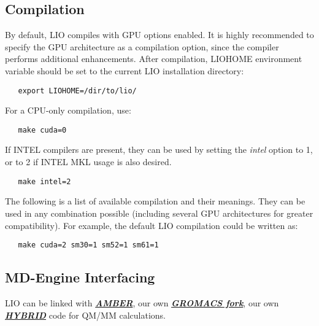 \subsection{Compilation}

By default, LIO compiles with GPU options enabled. It is highly
recommended to specify the GPU architecture as a compilation
option, since the compiler performs additional enhancements.
After compilation, LIOHOME environment variable should be set
to the current LIO installation directory:

\begin{lstlisting}
   export LIOHOME=/dir/to/lio/
\end{lstlisting}

For a CPU-only compilation, use:

\begin{lstlisting}
   make cuda=0
\end{lstlisting}

If INTEL compilers are present, they can be used by setting
the \textit{intel} option to 1, or to 2 if INTEL MKL usage is
also desired. 

\begin{lstlisting}
   make intel=2
\end{lstlisting}

The following is a list of available compilation and their meanings.
They can be used in any combination possible (including several GPU
architectures for greater compatibility). For example, the default
LIO compilation could be written as:

\begin{lstlisting}
   make cuda=2 sm30=1 sm52=1 sm61=1
\end{lstlisting}



\subsection{MD-Engine Interfacing}
LIO can be linked with  \textbf{\textit{\href{http://ambermd.org/index.php}
{AMBER}}}, our own \textbf{\textit{\href{https://github.com/MALBECC/gromacs}
{GROMACS fork}}}, our own \textbf{\textit{\href{https://github.com/MALBECC/hybrid}
{HYBRID}}} code for QM/MM calculations.

